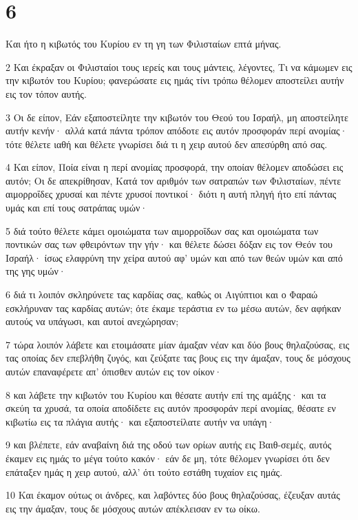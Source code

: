 \chapter{6}

\par Και ήτο η κιβωτός του Κυρίου εν τη γη των Φιλισταίων επτά μήνας.
\par 2 Και έκραξαν οι Φιλισταίοι τους ιερείς και τους μάντεις, λέγοντες, Τι να κάμωμεν εις την κιβωτόν του Κυρίου; φανερώσατε εις ημάς τίνι τρόπω θέλομεν αποστείλει αυτήν εις τον τόπον αυτής.
\par 3 Οι δε είπον, Εάν εξαποστείλητε την κιβωτόν του Θεού του Ισραήλ, μη αποστείλητε αυτήν κενήν· αλλά κατά πάντα τρόπον απόδοτε εις αυτόν προσφοράν περί ανομίας· τότε θέλετε ιαθή και θέλετε γνωρίσει διά τι η χειρ αυτού δεν απεσύρθη από σας.
\par 4 Και είπον, Ποία είναι η περί ανομίας προσφορά, την οποίαν θέλομεν αποδώσει εις αυτόν; Οι δε απεκρίθησαν, Κατά τον αριθμόν των σατραπών των Φιλισταίων, πέντε αιμορροΐδες χρυσαί και πέντε χρυσοί ποντικοί· διότι η αυτή πληγή ήτο επί πάντας υμάς και επί τους σατράπας υμών·
\par 5 διά τούτο θέλετε κάμει ομοιώματα των αιμορροΐδων σας και ομοιώματα των ποντικών σας των φθειρόντων την γήν· και θέλετε δώσει δόξαν εις τον Θεόν του Ισραήλ· ίσως ελαφρύνη την χείρα αυτού αφ' υμών και από των θεών υμών και από της γης υμών·
\par 6 διά τι λοιπόν σκληρύνετε τας καρδίας σας, καθώς οι Αιγύπτιοι και ο Φαραώ εσκλήρυναν τας καρδίας αυτών; ότε έκαμε τεράστια εν τω μέσω αυτών, δεν αφήκαν αυτούς να υπάγωσι, και αυτοί ανεχώρησαν;
\par 7 τώρα λοιπόν λάβετε και ετοιμάσατε μίαν άμαξαν νέαν και δύο βους θηλαζούσας, εις τας οποίας δεν επεβλήθη ζυγός, και ζεύξατε τας βους εις την άμαξαν, τους δε μόσχους αυτών επαναφέρετε απ' όπισθεν αυτών εις τον οίκον·
\par 8 και λάβετε την κιβωτόν του Κυρίου και θέσατε αυτήν επί της αμάξης· και τα σκεύη τα χρυσά, τα οποία αποδίδετε εις αυτόν προσφοράν περί ανομίας, θέσατε εν κιβωτίω εις τα πλάγια αυτής· και εξαποστείλατε αυτήν να υπάγη·
\par 9 και βλέπετε, εάν αναβαίνη διά της οδού των ορίων αυτής εις Βαιθ-σεμές, αυτός έκαμεν εις ημάς το μέγα τούτο κακόν· εάν δε μη, τότε θέλομεν γνωρίσει ότι δεν επάταξεν ημάς η χειρ αυτού, αλλ' ότι τούτο εστάθη τυχαίον εις ημάς.
\par 10 Και έκαμον ούτως οι άνδρες, και λαβόντες δύο βους θηλαζούσας, έζευξαν αυτάς εις την άμαξαν, τους δε μόσχους αυτών απέκλεισαν εν τω οίκω.
